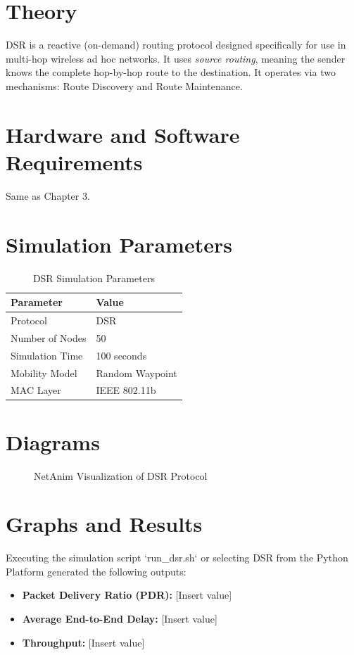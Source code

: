 \documentclass[12pt,a4paper]{report}
\begin{document}
\section{Theory}
DSR is a reactive (on-demand) routing protocol designed specifically for use in multi-hop wireless ad hoc networks. It uses \textit{source routing}, meaning the sender knows the complete hop-by-hop route to the destination. It operates via two mechanisms: Route Discovery and Route Maintenance.

\section{Hardware and Software Requirements}
Same as Chapter 3.

\section{Simulation Parameters}
\begin{table}[H]
    \centering
    \caption{DSR Simulation Parameters}
    \begin{tabular}{@{}ll@{}}
    \toprule
    \textbf{Parameter} & \textbf{Value} \\ \midrule
    Protocol & DSR \\
    Number of Nodes & 50 \\
    Simulation Time & 100 seconds \\
    Mobility Model & Random Waypoint \\
    MAC Layer & IEEE 802.11b \\ \bottomrule
    \end{tabular}
\end{table}

\section{Diagrams}
\begin{figure}[H]
    \centering
    \caption{NetAnim Visualization of DSR Protocol}
\end{figure}

\section{Graphs and Results}
Executing the simulation script `run\_dsr.sh` or selecting DSR from the Python Platform generated the following outputs:
\begin{itemize}
    \item \textbf{Packet Delivery Ratio (PDR):} [Insert value]
    \item \textbf{Average End-to-End Delay:} [Insert value]
    \item \textbf{Throughput:} [Insert value]
\end{itemize}
\end{document}
